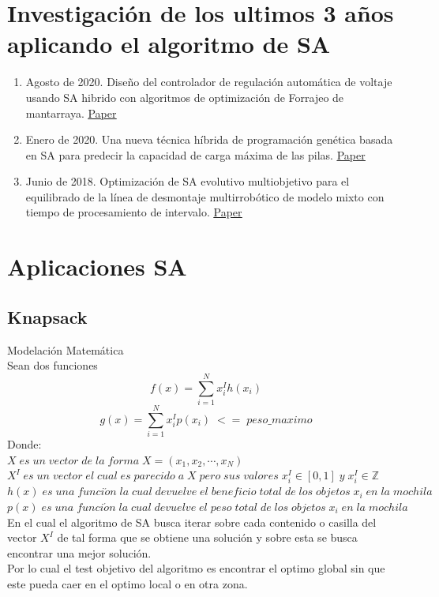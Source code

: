 \documentclass[10pt]{article}
\begin{document}
\section{Investigación de los ultimos 3 años aplicando el algoritmo de SA}
\begin{enumerate}
  \item Agosto de 2020. Diseño del controlador de regulación automática de voltaje usando SA hibrido con algoritmos de optimización de Forrajeo de mantarraya. \underline{\href{https://www.sciencedirect.com/science/article/pii/S2090447920301416}{Paper}}
  \item Enero de 2020. Una nueva técnica híbrida de programación genética basada en SA para predecir la capacidad de carga máxima de las pilas. \underline{\href{https://link.springer.com/article/10.1007/s00366-019-00932-9}{Paper}}
  \item Junio de 2018. Optimización de SA evolutivo multiobjetivo para el equilibrado de la línea de desmontaje multirrobótico de modelo mixto con tiempo de procesamiento de intervalo. \underline{\href{https://www.tandfonline.com/doi/abs/10.1080/00207543.2019.1602290}{Paper}}
\end{enumerate}
\section{Aplicaciones SA}
\subsection{Knapsack}
Modelación Matemática\\
Sean dos funciones
\[f(x)=\sum_{i=1}^{N}x^{I}_{i}h(x_{i})\]
\[g(x)=\sum_{i=1}^{N}x^{I}_{i}p(x_{i})\;<=\;peso\_maximo\]
Donde:\\
\(\displaystyle X\;es\;un\;vector\;de\;la\;forma\;X=(x_{1},x_{2},\cdots,x_{N})\)\\\vspace{0.25cm}
\(\displaystyle X^{I}\;es\;un\;vector\;el\;cual\;es\;parecido\;a\;X\;pero\;sus\;valores\;x_{i}^{I}\in[0,1]\;y\;x_{i}^{I}\in\mathbb{Z}\)\\\vspace{0.25cm}
\(\displaystyle h(x)\;es\;una\;funci\acute{o}n\;la\;cual\;devuelve\;el\;beneficio\;total\;de\;los\;objetos\;x_{i}\;en\;la\;mochila\)\\\vspace{0.25cm}
\(\displaystyle p(x)\;es\;una\;funci\acute{o}n\;la\;cual\;devuelve\;el\;peso\;total\;de\;los\;objetos\;x_{i}\;en\;la\;mochila\)\\\vspace{0.25cm}
En el cual el algoritmo de SA busca iterar sobre cada contenido o casilla del vector $X^{I}$ de tal forma que se obtiene una solución y sobre esta se busca encontrar una mejor solución.\\
Por lo cual el test objetivo del algoritmo es encontrar el optimo global sin que este pueda caer en el optimo local o en otra zona.
\end{document}
